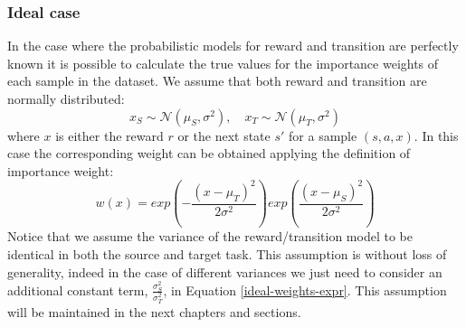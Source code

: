   \subsubsection{Ideal case}
    \noindent In the case where the probabilistic models for reward and transition are perfectly known it
    is possible to calculate the true values for the importance weights of each sample in the dataset.
    We assume that both reward and transition are normally distributed:
    \begin{equation}
      x_{S} \sim \mathcal{N}(\mu_{S}, \sigma^{2}), \quad x_{T} \sim \mathcal{N}(\mu_{T}, \sigma^{2})
    \end{equation}
    where $x$ is either the reward $r$ or the next state $s'$ for a sample $(s,a,x)$.\newline
    In this case the corresponding weight can be obtained applying the definition of importance weight:
    \begin{equation}
      w(x) = exp \left ( -\frac{(x-\mu_{T})^{2}}{2\sigma^{2}} \right ) exp \left ( \frac{(x-\mu_{S})^{2}}{2\sigma^{2}} \right )
      \label{ideal-weights-expr}
    \end{equation}
    Notice that we assume the variance of the reward/transition model to be identical in both the source and target task.
    This assumption is without loss of generality, indeed in the case of different variances we just need to
    consider an additional constant term, $\frac{\sigma^{2}_{S}}{\sigma^{2}_{T}}$, in Equation \ref{ideal-weights-expr}.
    This assumption will be maintained in the next chapters and sections.

